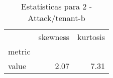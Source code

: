 \begin{table}[htbp]
\caption{Estatísticas para 2 - Attack/tenant-b}
\label{tab:2_-_attack_tenant-b_skewkurt}
\begin{tabular}{lrr}
\toprule
 & skewness & kurtosis \\
metric &  &  \\
\midrule
value & 2.07 & 7.31 \\
\bottomrule
\end{tabular}
\end{table}
